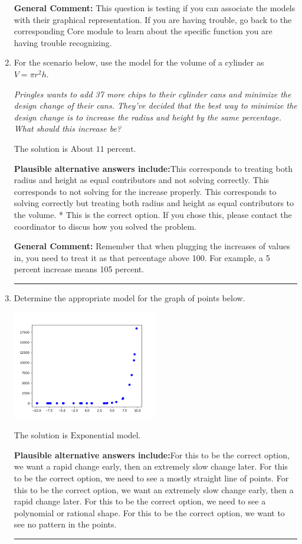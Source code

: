 \documentclass{extbook}[14pt]
\newcommand{\litem}[1]{\item #1

\rule{\textwidth}{0.4pt}}
\begin{document}
\begin{enumerate}
{\textbf{General Comment:} This question is testing if you can associate the models with their graphical representation. If you are having trouble, go back to the corresponding Core module to learn about the specific function you are having trouble recognizing.
}
\litem{
For the scenario below, use the model for the volume of a cylinder as $V = \pi r^2 h$.

\begin{center}
    \textit{ Pringles wants to add 37 \text{percent} more chips to their cylinder cans and minimize the design change of their cans. They've decided that the best way to minimize the design change is to increase the radius and height by the same percentage. What should this increase be? }
\end{center}
The solution is \( \text{About } 11 \text{ percent} \).\begin{enumerate}[label=\Alph*.]
\textbf{Plausible alternative answers include:}This corresponds to treating both radius and height as equal contributors and not solving correctly.
This corresponds to not solving for the increase properly.
This corresponds to solving correctly but treating both radius and height as equal contributors to the volume.
* This is the correct option.
If you chose this, please contact the coordinator to discus how you solved the problem.
\end{enumerate}

\textbf{General Comment:} Remember that when plugging the increases of values in, you need to treat it as that percentage above 100. For example, a 5 percent increase means 105 percent.
}
\litem{
Determine the appropriate model for the graph of points below.

\begin{center}
    \includegraphics[width=0.5\textwidth]{../Figures/identifyModelGraph12B.png}
\end{center}


The solution is \( \text{Exponential model} \).\begin{enumerate}[label=\Alph*.]
\textbf{Plausible alternative answers include:}For this to be the correct option, we want a rapid change early, then an extremely slow change later.
For this to be the correct option, we need to see a mostly straight line of points.
For this to be the correct option, we want an extremely slow change early, then a rapid change later.
For this to be the correct option, we need to see a polynomial or rational shape.
For this to be the correct option, we want to see no pattern in the points.
\end{enumerate}

}
\end{enumerate}
\end{document}

